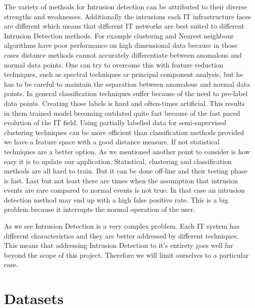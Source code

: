 \documentclass[reqno,openany,12pt]{amsbook}
\begin{document}
The variety of methods for Intrusion detection can be attributed to their diverse strengths and weaknesses. Additionally the intrusions each IT infrastructure faces are different which means that different IT networks are best suited to different Intrusion Detection methods. For example clustering and Nearest neighbour algorithms have poor performance on high dimensional data because in those cases distance methods cannot accurately differentiate between anomalous and normal data points.
One can try to overcome this with feature reduction techniques, such as spectral techniques or principal component analysis, but he has to be careful to maintain the separation between anomalous and normal data points. In general classification techniques suffer because of the need to pre-label data points. Creating those labels is hard and often-times artificial. This results in them trained model becoming outdated quite fast because of the fast paced evolution of the IT field. Using partially labelled data for semi-supervised clustering techniques can be more efficient than classification methods provided we have a feature space with a good distance measure. If not statistical techniques are a better option. As we mentioned another point to consider is how easy it is to update our application. Statistical, clustering and classification methods are all hard to train. But it can be done off-line and their testing phase is fast. Last but not least there are times when the assumption that intrusion events are rare compared to normal events is not true. In that case an intrusion detection method may end up with a high false positive rate. This is a big problem because it interrupts the normal operation of the user.

As we see Intrusion Detection is a very complex problem.  Each IT system has different characteristics and they are better addressed by different techniques. This means that addressing Intrusion Detection to it's entirety goes well far beyond the scope of this project. Therefore we will limit ourselves to a particular case.




\section{Datasets}
\end{document}
